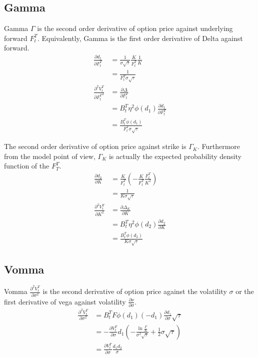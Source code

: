 \documentclass{article}
\begin{document}
\subsection{Gamma}

Gamma $ \Gamma $ is the second order derivative of option price against underlying forward $ F_t^T $.
Equivalently, Gamma is the first order derivative of Delta against forward. 
\begin{align} \label{Gamma_F derivation}
    \frac{\partial d_1}{\partial F_t^T} &= \frac{1}{\sigma \sqrt{\tau}} \frac{K}{F_t^T} \frac{1}{K} \nonumber \\
    &= \frac{1}{F_t^T \sigma \sqrt{\tau}} \nonumber \\
    \frac{\partial^2 V_t^T}{{\partial F_t^T}^2} &= \frac{\partial \Delta}{\partial F_t^T} \nonumber \\
    &= B_t^T \eta^2 \phi(d_1) \frac{\partial d_1}{\partial F_t^T} \nonumber \\
    &= \frac{B_t^T \phi(d_1)}{F_t^T \sigma \sqrt{\tau}}
\end{align}

The second order derivative of option price against strike is $ \Gamma_K $.
Furthermore from the model point of view, $ \Gamma_K $ is actually the expected probability density function of the $ F_T^T $.
\begin{align} \label{Gamma_K derivation}
    \frac{\partial d_2}{\partial K} &= \frac{K}{F_t^T} \left(-\frac{K}{F_t^T} \frac{F_t^T}{K^2} \right) \nonumber \\
    &= \frac{1}{K \sigma \sqrt{\tau}} \nonumber \\
    \frac{\partial^2 V_t^T}{{\partial K}^2} &= \frac{\partial \Delta_K}{\partial K} \nonumber \\
    &= B_t^T \eta^2 \phi(d_2) \frac{\partial d_2}{\partial K} \nonumber \\
    &= \frac{B_t^T \phi(d_2)}{K \sigma \sqrt{\tau}}
\end{align}

\subsection{Vomma}

Vomma $ \frac{\partial^2 V_t^T}{\partial \sigma^2} $ is the second derivative of option price against the volatility $ \sigma $ or the first derivative of vega against volatility $ \frac{\partial \nu}{\partial \sigma} $.
\begin{align}
    \frac{\partial^2 V_t^T}{\partial \sigma^2} &= B_t^T F \phi(d_1) (-d_1) \frac{\partial d_1}{\partial \sigma} \sqrt{\tau} \nonumber \\
    &= -\frac{\partial V_t^T}{\partial \sigma} d_1 \left(-\frac{\ln{\frac{F}{K}}}{\sigma^2 \sqrt{\tau}} + \frac{1}{2} \sigma \sqrt{\tau}\right) \nonumber \\
    &= \frac{\partial V_t^T}{\partial \sigma} \frac{d_1 d_2}{\sigma}
\end{align}
\end{document}
